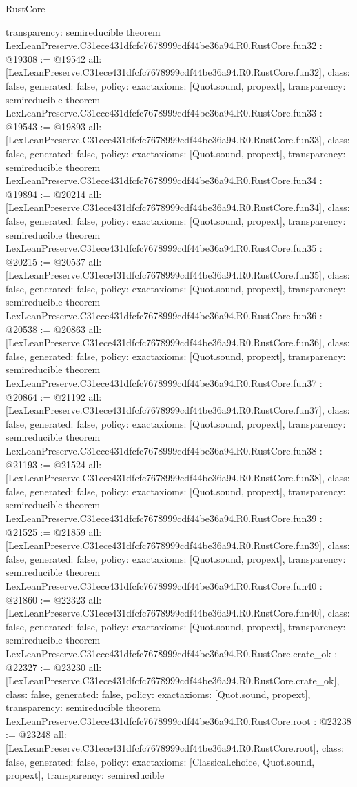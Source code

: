 \begin{lexlean}{RustCore}
\begin{coremodule}
{  transparency: semireducible
}
theorem LexLeanPreserve.C31ece431dfcfc7678999cdf44be36a94.R0.RustCore.fun32 : @19308 := @19542 {
  all: [LexLeanPreserve.C31ece431dfcfc7678999cdf44be36a94.R0.RustCore.fun32],
  class: false,
  generated: false,
  policy: exact{axioms: [Quot.sound, propext]},
  transparency: semireducible
}
theorem LexLeanPreserve.C31ece431dfcfc7678999cdf44be36a94.R0.RustCore.fun33 : @19543 := @19893 {
  all: [LexLeanPreserve.C31ece431dfcfc7678999cdf44be36a94.R0.RustCore.fun33],
  class: false,
  generated: false,
  policy: exact{axioms: [Quot.sound, propext]},
  transparency: semireducible
}
theorem LexLeanPreserve.C31ece431dfcfc7678999cdf44be36a94.R0.RustCore.fun34 : @19894 := @20214 {
  all: [LexLeanPreserve.C31ece431dfcfc7678999cdf44be36a94.R0.RustCore.fun34],
  class: false,
  generated: false,
  policy: exact{axioms: [Quot.sound, propext]},
  transparency: semireducible
}
theorem LexLeanPreserve.C31ece431dfcfc7678999cdf44be36a94.R0.RustCore.fun35 : @20215 := @20537 {
  all: [LexLeanPreserve.C31ece431dfcfc7678999cdf44be36a94.R0.RustCore.fun35],
  class: false,
  generated: false,
  policy: exact{axioms: [Quot.sound, propext]},
  transparency: semireducible
}
theorem LexLeanPreserve.C31ece431dfcfc7678999cdf44be36a94.R0.RustCore.fun36 : @20538 := @20863 {
  all: [LexLeanPreserve.C31ece431dfcfc7678999cdf44be36a94.R0.RustCore.fun36],
  class: false,
  generated: false,
  policy: exact{axioms: [Quot.sound, propext]},
  transparency: semireducible
}
theorem LexLeanPreserve.C31ece431dfcfc7678999cdf44be36a94.R0.RustCore.fun37 : @20864 := @21192 {
  all: [LexLeanPreserve.C31ece431dfcfc7678999cdf44be36a94.R0.RustCore.fun37],
  class: false,
  generated: false,
  policy: exact{axioms: [Quot.sound, propext]},
  transparency: semireducible
}
theorem LexLeanPreserve.C31ece431dfcfc7678999cdf44be36a94.R0.RustCore.fun38 : @21193 := @21524 {
  all: [LexLeanPreserve.C31ece431dfcfc7678999cdf44be36a94.R0.RustCore.fun38],
  class: false,
  generated: false,
  policy: exact{axioms: [Quot.sound, propext]},
  transparency: semireducible
}
theorem LexLeanPreserve.C31ece431dfcfc7678999cdf44be36a94.R0.RustCore.fun39 : @21525 := @21859 {
  all: [LexLeanPreserve.C31ece431dfcfc7678999cdf44be36a94.R0.RustCore.fun39],
  class: false,
  generated: false,
  policy: exact{axioms: [Quot.sound, propext]},
  transparency: semireducible
}
theorem LexLeanPreserve.C31ece431dfcfc7678999cdf44be36a94.R0.RustCore.fun40 : @21860 := @22323 {
  all: [LexLeanPreserve.C31ece431dfcfc7678999cdf44be36a94.R0.RustCore.fun40],
  class: false,
  generated: false,
  policy: exact{axioms: [Quot.sound, propext]},
  transparency: semireducible
}
theorem LexLeanPreserve.C31ece431dfcfc7678999cdf44be36a94.R0.RustCore.crate_ok : @22327 := @23230 {
  all: [LexLeanPreserve.C31ece431dfcfc7678999cdf44be36a94.R0.RustCore.crate_ok],
  class: false,
  generated: false,
  policy: exact{axioms: [Quot.sound, propext]},
  transparency: semireducible
}
theorem LexLeanPreserve.C31ece431dfcfc7678999cdf44be36a94.R0.RustCore.root : @23238 := @23248 {
  all: [LexLeanPreserve.C31ece431dfcfc7678999cdf44be36a94.R0.RustCore.root],
  class: false,
  generated: false,
  policy: exact{axioms: [Classical.choice, Quot.sound, propext]},
  transparency: semireducible
}


\end{coremodule}
\end{lexlean}
